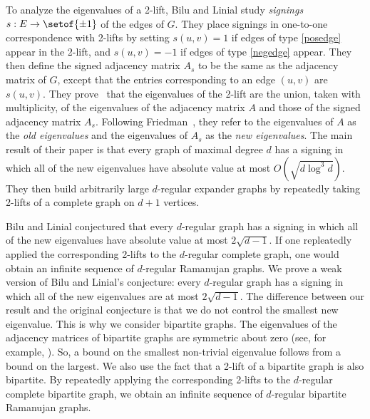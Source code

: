 \documentclass[11pt]{article}
\begin{document}
To analyze the eigenvalues of a 2-lift, Bilu and Linial study 
  \textit{signings} $s : E \rightarrow \setof{\pm 1}$ of the edges of $G$.
They place signings in one-to-one correspondence with 2-lifts
   by setting $s (u,v) = 1$ if edges of type \eqref{posedge}
  appear in the 2-lift, and $s (u,v) = -1$ if edges of type \eqref{negedge} appear.
They then define the signed adjacency matrix $A_s$ to be the same as the adjacency matrix of $G$,
  except that the entries corresponding to an edge
  $(u,v)$ are $s (u,v)$.
They prove~\cite[Lemma~3.1]{BiluLinial}
  that the eigenvalues of the 2-lift are the union, taken with multiplicity,
  of the eigenvalues of the adjacency matrix $A$ and those of the signed
  adjacency matrix $A_s$.
Following Friedman~\cite{friedman2003relative}, they refer to the eigenvalues of $A$
  as the \textit{old eigenvalues} and the eigenvalues of $A_s$
  as the \textit{new eigenvalues}.
The main result of their paper is that every graph of maximal degree $d$ has a signing in which
  all of the new eigenvalues have absolute value at most
  $O (\sqrt{d \log^{3} d} )$.
They then build arbitrarily large $d$-regular 
  expander graphs by repeatedly taking 2-lifts of
  a complete graph on $d+1$
  vertices.

Bilu and Linial conjectured that every $d$-regular graph
  has a signing
 in which
  all of the new eigenvalues have absolute value at most
  $2 \sqrt{d -1}$.
If one repleatedly applied the corresponding 2-lifts to the $d$-regular
  complete graph, one would obtain an infinite sequence of
  $d$-regular Ramanujan graphs.
We prove a weak version of Bilu and Linial's conjecture:
  every $d$-regular graph has a signing
 in which
  all of the new eigenvalues are at most
  $2 \sqrt{d -1}$.
The difference between our result and the original conjecture
  is that we do not control the smallest new eigenvalue.
This is why we consider bipartite graphs.
The eigenvalues of the adjacency matrices of bipartite graphs are
  symmetric about zero (see, for example, \cite[Theorem 2.4.2]{GodsilBook}).
So, a bound on the smallest non-trivial eigenvalue follows from
  a bound on the largest.
We also use the fact that a 2-lift of a bipartite graph
   is also bipartite.
By repeatedly applying the corresponding 2-lifts to the $d$-regular
  complete bipartite graph, we obtain an infinite sequence
  of $d$-regular bipartite Ramanujan graphs.
\end{document}
